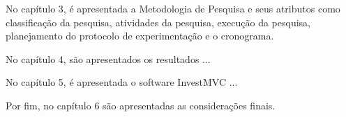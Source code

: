 No capítulo 3, é apresentada a Metodologia de Pesquisa e seus atributos como classificação da pesquisa, atividades da pesquisa, execução da pesquisa, planejamento do protocolo de experimentação e o cronograma.

No capítulo 4, são apresentados os resultados ...

No capítulo 5, é apresentada o software InvestMVC ...

Por fim, no capítulo 6 são apresentadas as considerações finais.
